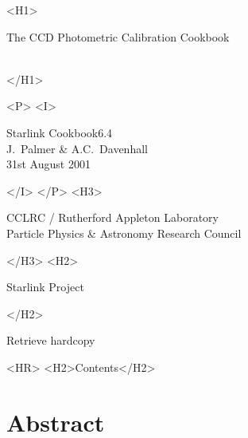 \documentclass[twoside,11pt]{article}
\newcommand{\stardoccategory}  {Starlink Cookbook}
\newcommand{\stardocsource}    {sc\stardocnumber}
\newcommand{\stardocnumber}    {6.4}
\newcommand{\stardocauthors}   {J.~Palmer \& A.C.~Davenhall}
\newcommand{\stardocdate}      {31st August 2001}
\newcommand{\stardoctitle}     {The CCD Photometric Calibration Cookbook}
\newcommand{\htmladdnormallink}[2]{#1}
\newcommand{\htmladdimg}[1]{}
\newcommand{\htmlref}[2]{#1}
\newcommand{\htmladdtonavigation}[1]{}
\newcommand{\xlabel}[1]{}
\newcommand{\latexonlytoc}[0]{\tableofcontents}
\begin{document}
\begin{htmlonly}
   \xlabel{}
   \begin{rawhtml} <H1> \end{rawhtml}
      \stardoctitle\\
      \stardocversion\\
      \stardocmanual
   \begin{rawhtml} </H1> \end{rawhtml}


   \begin{rawhtml} <P> <I> \end{rawhtml}
   \stardoccategory \stardocnumber \\
   \stardocauthors \\
   \stardocdate
   \begin{rawhtml} </I> </P> <H3> \end{rawhtml}
      \htmladdnormallink{CCLRC}{http://www.cclrc.ac.uk} /
      \htmladdnormallink{Rutherford Appleton Laboratory}
                        {http://www.cclrc.ac.uk/ral} \\
      \htmladdnormallink{Particle Physics \& Astronomy Research Council}
                        {http://www.pparc.ac.uk} \\
   \begin{rawhtml} </H3> <H2> \end{rawhtml}
      \htmladdnormallink{Starlink Project}{http://star-www.rl.ac.uk/}
   \begin{rawhtml} </H2> \end{rawhtml}
   \htmladdnormallink{\htmladdimg{source.gif} Retrieve hardcopy}
      {http://star-www.rl.ac.uk/cgi-bin/hcserver?\stardocsource}\\

  \label{stardoccontents}
  \begin{rawhtml} 
    <HR>
    <H2>Contents</H2>
  \end{rawhtml}
  \newcommand{\latexonlytoc}[0]{}
  \htmladdtonavigation{\htmlref{\htmladdimg{contents_motif.gif}}
        {stardoccontents}}

  \section{\xlabel{abstract}Abstract}
\end{htmlonly}
\end{document}
